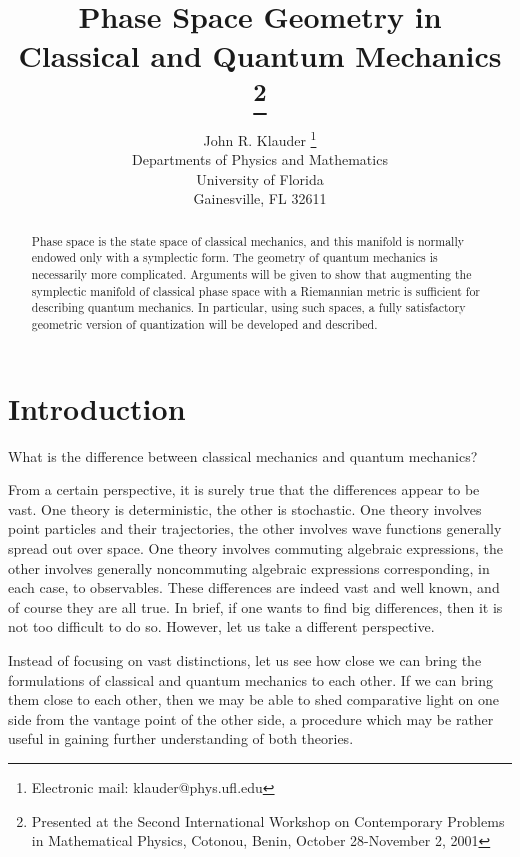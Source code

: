 \documentclass[12pt]{article}
\begin{document}
\title{Phase Space Geometry in \\Classical and Quantum Mechanics
\footnote{Presented at the Second International Workshop on Contemporary 
Problems in Mathematical Physics, Cotonou, Benin, October 28-November 2,
2001}}
\author{John R. Klauder
\footnote{Electronic mail: klauder@phys.ufl.edu}\\
Departments of Physics and Mathematics\\
University of Florida\\
Gainesville, FL  32611}
\date{}     %
\maketitle
\begin{abstract}
Phase space is the state space of classical mechanics, and this manifold 
is normally endowed only with a symplectic form. The geometry of quantum 
mechanics is necessarily more complicated. Arguments will be given to 
show that augmenting the symplectic manifold of classical phase space 
with a Riemannian metric is sufficient for describing quantum mechanics. 
In particular, using such spaces, a fully satisfactory geometric version 
of quantization will be developed and described.
\end{abstract}
\section{Introduction}
What is the difference between classical mechanics and quantum mechanics? 

{}From a certain perspective, it is surely true that the differences appear 
to be vast. One theory is deterministic, the other is stochastic. One 
theory involves point particles and their trajectories, the other 
involves wave functions generally spread out over space. One theory 
involves commuting algebraic expressions, the other involves generally 
noncommuting algebraic expressions corresponding, in each case, to 
observables. These differences are indeed vast and well known, and 
of course they are all true. In brief, if one wants to find big 
differences, then it is not too difficult to do so. However, let us 
take a different perspective.

Instead of focusing on vast distinctions, let us see how close we can 
bring the formulations of classical and quantum mechanics to each other. 
If we can bring them close to each other, then we may be able to shed 
comparative light on one side from the vantage point of the other side, 
a procedure which may be rather useful in gaining further understanding 
of both theories.
\end{document}
